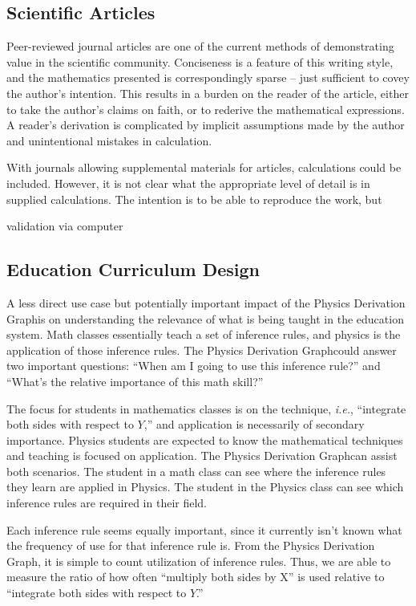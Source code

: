 \documentclass{article}
\newcommand{\ie}{\textit{i.e.}} %
\newcommand{\pdg}{Physics Derivation Graph}
\begin{document}
\begin{multicols}{2}
\subsection{Scientific Articles}

Peer-reviewed journal articles are one of the current methods of demonstrating value in the scientific community. Conciseness is a feature of this writing style, and the mathematics presented is correspondingly sparse -- just sufficient to covey the author's intention. This results in a burden on the reader of the article, either to take the author's claims on faith, or to rederive the mathematical expressions. A reader's derivation is complicated by implicit assumptions made by the author and unintentional mistakes in calculation. 

With journals allowing supplemental materials for articles, calculations could be included. However, it is not clear what the appropriate level of detail is in supplied calculations. The intention is to be able to reproduce the work, but 

validation via computer 

\subsection{Education Curriculum Design}

A less direct use case but potentially important impact of the \pdg is on understanding the relevance of what is being taught in the education system. Math classes essentially teach a set of inference rules, and physics is the application of those inference rules. The \pdg could answer two important questions: ``When am I going to use this inference rule?'' and ``What's the relative importance of this math skill?''

The focus for students in mathematics classes is on the technique, \ie, ``integrate both sides with respect to $Y$,'' and application is necessarily of secondary importance. Physics students are expected to know the mathematical techniques and teaching is focused on application. The \pdg can assist both scenarios. The student in a math class can see where the inference rules they learn are applied in Physics. The student in the Physics class can see which inference rules are required in their field. 

Each inference rule seems equally important, since it currently isn't known what the frequency of use for that inference rule is. From the \pdg, it is simple to count utilization of inference rules. Thus, we are able to measure the ratio of how often ``multiply both sides by X'' is used relative to ``integrate both sides with respect to $Y$.'' 


\end{multicols}
\end{document}
